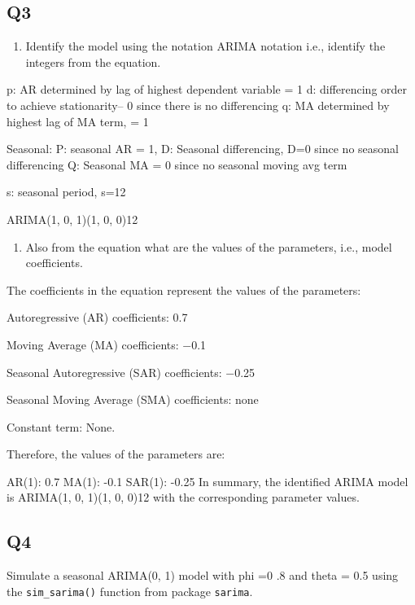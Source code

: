 \documentclass[
]{article}
\providecommand{\tightlist}{%
  \setlength{\itemsep}{0pt}\setlength{\parskip}{0pt}}
\begin{document}
\hypertarget{q3}{%
\subsection{Q3}\label{q3}}

\begin{enumerate}
\def\labelenumi{(\alph{enumi})}
\tightlist
\item
  Identify the model using the notation ARIMA notation i.e., identify
  the integers from the equation.
\end{enumerate}

p: AR determined by lag of highest dependent variable = 1 d:
differencing order to achieve stationarity-- 0 since there is no
differencing q: MA determined by highest lag of MA term, = 1

Seasonal: P: seasonal AR = 1, D: Seasonal differencing, D=0 since no
seasonal differencing Q: Seasonal MA = 0 since no seasonal moving avg
term

s: seasonal period, s=12

ARIMA(1, 0, 1)(1, 0, 0)12

\begin{enumerate}
\def\labelenumi{(\alph{enumi})}
\setcounter{enumi}{1}
\tightlist
\item
  Also from the equation what are the values of the parameters, i.e.,
  model coefficients.
\end{enumerate}

The coefficients in the equation represent the values of the parameters:

Autoregressive (AR) coefficients: 0.7

Moving Average (MA) coefficients: −0.1

Seasonal Autoregressive (SAR) coefficients: −0.25

Seasonal Moving Average (SMA) coefficients: none

Constant term: None.

Therefore, the values of the parameters are:

AR(1): 0.7 MA(1): -0.1 SAR(1): -0.25 In summary, the identified ARIMA
model is ARIMA(1, 0, 1)(1, 0, 0)12 with the corresponding parameter
values.

\hypertarget{q4}{%
\subsection{Q4}\label{q4}}

Simulate a seasonal ARIMA(0, 1) model with phi =0 .8 and theta = 0.5
using the \texttt{sim\_sarima()} function from package \texttt{sarima}.
\end{document}
